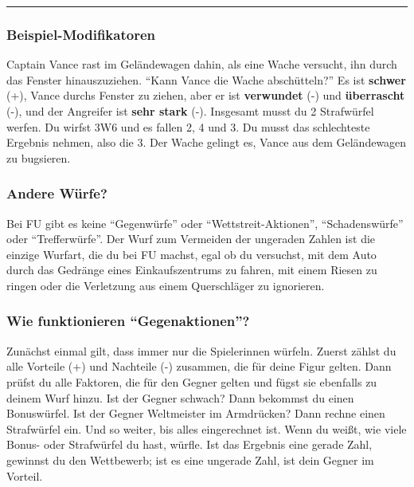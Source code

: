 \documentclass[]{article}
\begin{document}
\begin{center}\rule{0.5\linewidth}{\linethickness}\end{center}

\subsubsection{Beispiel-Modifikatoren}\label{beispiel-modifikatoren}

Captain Vance rast im Geländewagen dahin, als eine Wache versucht, ihn
durch das Fenster hinauszuziehen. ``Kann Vance die Wache abschütteln?''
Es ist \textbf{schwer} (+), Vance durchs Fenster zu ziehen, aber er ist
\textbf{verwundet} (-) und \textbf{überrascht} (-), und der Angreifer
ist \textbf{sehr stark} (-). Insgesamt musst du 2 Strafwürfel werfen. Du
wirfst 3W6 und es fallen 2, 4 und 3. Du musst das schlechteste Ergebnis
nehmen, also die 3. Der Wache gelingt es, Vance aus dem Geländewagen zu
bugsieren.

\subsubsection{Andere Würfe?}\label{andere-wuxfcrfe}

Bei FU gibt es keine ``Gegenwürfe'' oder ``Wettstreit-Aktionen'',
``Schadenswürfe'' oder ``Trefferwürfe''. Der Wurf zum Vermeiden der
ungeraden Zahlen ist die einzige Wurfart, die du bei FU machst, egal ob
du versuchst, mit dem Auto durch das Gedränge eines Einkaufszentrums zu
fahren, mit einem Riesen zu ringen oder die Verletzung aus einem
Querschläger zu ignorieren.

\subsubsection{\texorpdfstring{Wie funktionieren
``Gegenaktionen''?}{Wie funktionieren Gegenaktionen?}}\label{wie-funktionieren-gegenaktionen}

Zunächst einmal gilt, dass immer nur die Spielerinnen würfeln. Zuerst
zählst du alle Vorteile (+) und Nachteile (-) zusammen, die für deine
Figur gelten. Dann prüfst du alle Faktoren, die für den Gegner gelten
und fügst sie ebenfalls zu deinem Wurf hinzu. Ist der Gegner schwach?
Dann bekommst du einen Bonuswürfel. Ist der Gegner Weltmeister im
Armdrücken? Dann rechne einen Strafwürfel ein. Und so weiter, bis alles
eingerechnet ist. Wenn du weißt, wie viele Bonus- oder Strafwürfel du
hast, würfle. Ist das Ergebnis eine gerade Zahl, gewinnst du den
Wettbewerb; ist es eine ungerade Zahl, ist dein Gegner im Vorteil.
\end{document}
